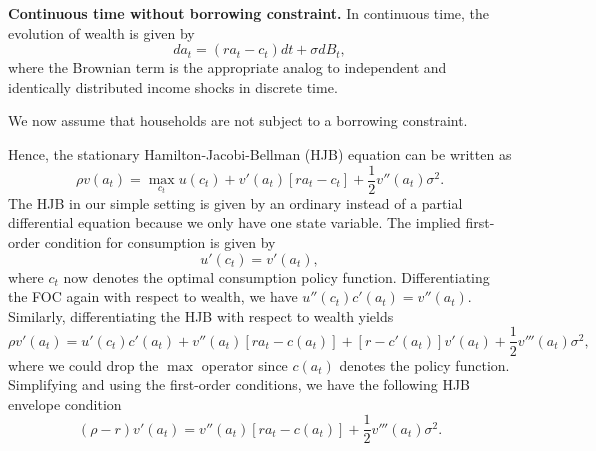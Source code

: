 \documentclass[11pt]{extarticle}
\theoremstyle{plain}
\theoremstyle{definition}
\begin{document}
\vspace{5mm}
\noindent
\textbf{Continuous time without borrowing constraint.} In continuous time, the evolution of wealth is given by 
\begin{equation}
	da_t = (ra_t - c_t) dt + \sigma dB_t,
\end{equation}
where the Brownian term is the appropriate analog to independent and identically distributed income shocks in discrete time. 

We now assume that households are not subject to a borrowing constraint.

Hence, the stationary Hamilton-Jacobi-Bellman (HJB) equation can be written as 
\begin{equation}
	\rho v(a_t) = \max_{c_t} u(c_t) + v'(a_t) [ra_t - c_t] + \frac{1}{2} v''(a_t) \sigma^2.
\end{equation}
The HJB in our simple setting is given by an ordinary instead of a partial differential equation because we only have one state variable. 
The implied first-order condition for consumption is given by
\begin{equation}
	u'(c_t) = v'(a_t),
\end{equation}
where $c_t$ now denotes the optimal consumption policy function. Differentiating the FOC again with respect to wealth, we have $u''(c_t) c'(a_t) = v''(a_t)$. Similarly, differentiating the HJB with respect to wealth yields 
\begin{equation*}
	\rho v'(a_t) = u'(c_t)c'(a_t) + v''(a_t) [ra_t - c(a_t)] + [r - c'(a_t)] v'(a_t) + \frac{1}{2} v'''(a_t) \sigma^2,
\end{equation*}
where we could drop the $\max$ operator since $c(a_t)$ denotes the policy function. Simplifying and using the first-order conditions, we have the following HJB envelope condition
\begin{equation*}
	(\rho - r) v'(a_t) = v''(a_t) [ra_t - c(a_t)] + \frac{1}{2} v'''(a_t) \sigma^2.
\end{equation*}
\end{document}
